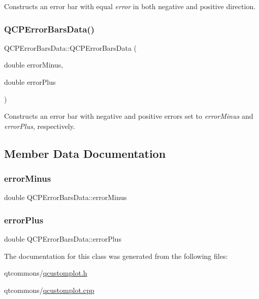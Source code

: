 Constructs an error bar with equal {\itshape error} in both negative and positive direction. \mbox{\label{class_q_c_p_error_bars_data_a7c61e42d87aea3312262d5429bc28387}} 
\subsubsection{\texorpdfstring{QCPErrorBarsData()}{QCPErrorBarsData()}\hspace{0.1cm}{\footnotesize\ttfamily [3/3]}}
{\footnotesize\ttfamily Q\+C\+P\+Error\+Bars\+Data\+::\+Q\+C\+P\+Error\+Bars\+Data (\begin{DoxyParamCaption}\item[{double}]{error\+Minus,  }\item[{double}]{error\+Plus }\end{DoxyParamCaption})}

Constructs an error bar with negative and positive errors set to {\itshape error\+Minus} and {\itshape error\+Plus}, respectively. 

\subsection{Member Data Documentation}
\mbox{\label{class_q_c_p_error_bars_data_af8aaea160e52c14c57836224ee78020b}} 
\subsubsection{\texorpdfstring{errorMinus}{errorMinus}}
{\footnotesize\ttfamily double Q\+C\+P\+Error\+Bars\+Data\+::error\+Minus}

\mbox{\label{class_q_c_p_error_bars_data_ad1283c99fbfccf37a0226b1df52f0776}} 
\subsubsection{\texorpdfstring{errorPlus}{errorPlus}}
{\footnotesize\ttfamily double Q\+C\+P\+Error\+Bars\+Data\+::error\+Plus}



The documentation for this class was generated from the following files\+:\begin{DoxyCompactItemize}
\item 
qtcommons/\mbox{\hyperlink{qcustomplot_8h}{qcustomplot.\+h}}\item 
qtcommons/\mbox{\hyperlink{qcustomplot_8cpp}{qcustomplot.\+cpp}}\end{DoxyCompactItemize}
